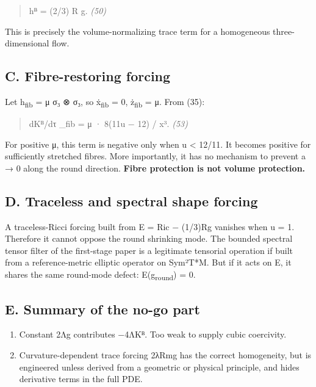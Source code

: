 \documentclass[
]{article}
\begin{document}
\begin{quote}
hᴯ = (2/3) R g. \emph{(50)}
\end{quote}

This is precisely the volume-normalizing trace term for a homogeneous three-dimensional flow.

\subsection{C. Fibre-restoring forcing}\label{c.-fibre-restoring-forcing}

Let h\textsubscript{fib} = μ σ₃ ⊗ σ₃, so ẋ\textbar{}\textsubscript{fib} = 0, ż\textbar{}\textsubscript{fib} = μ. From (35):

\begin{quote}
dKᴮ/dτ \textbar\_fib = μ · 8(11u − 12) / x³. \emph{(53)}
\end{quote}

For positive μ, this term is negative only when u \textless{} 12/11. It becomes positive for sufficiently stretched fibres. More importantly, it has no mechanism to prevent a → 0 along the round direction. \textbf{Fibre protection is not volume protection.}

\subsection{D. Traceless and spectral shape forcing}\label{d.-traceless-and-spectral-shape-forcing}

A traceless-Ricci forcing built from E = Ric − (1/3)Rg vanishes when u = 1. Therefore it cannot oppose the round shrinking mode. The bounded spectral tensor filter of the first-stage paper is a legitimate tensorial operation if built from a reference-metric elliptic operator on Sym²T*M. But if it acts on E, it shares the same round-mode defect: E(g\textsubscript{round}) = 0.

\subsection{E. Summary of the no-go part}\label{e.-summary-of-the-no-go-part}

\begin{enumerate}
\def\labelenumi{(\arabic{enumi})}
\setcounter{enumi}{16}
\item
  Constant 2Λg contributes −4ΛKᴮ. Too weak to supply cubic coercivity.
\item
  Curvature-dependent trace forcing 2λ\textbar Rm\textbar g has the correct homogeneity, but is engineered unless derived from a geometric or physical principle, and hides derivative terms in the full PDE.
\end{enumerate}
\end{document}
